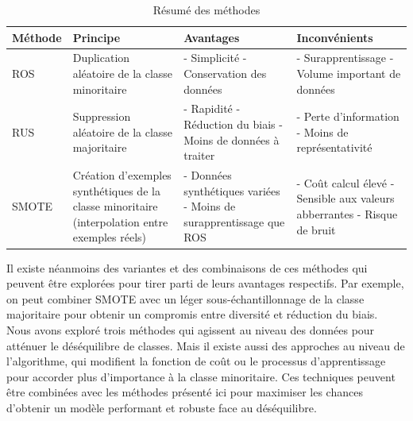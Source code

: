 \documentclass{article}
\begin{document}
\begin{table}[h!]
\centering
\begin{tabular}{|p{1.5cm}|p{4cm}|p{4.5cm}|p{4.2cm}|}
\hline

\centering
\textbf{Méthode} & \textbf{Principe} & \textbf{Avantages} & \textbf{Inconvénients} \\ \hline

\centering
ROS &
Duplication aléatoire de la classe minoritaire &
- Simplicité \newline
- Conservation des données &
- Surapprentissage \newline
- Volume important de \newline données \\ \hline


\centering
RUS &
Suppression aléatoire de la classe majoritaire &
- Rapidité \newline
- Réduction du biais \newline
- Moins de données à traiter &
- Perte d’information \newline
- Moins de représentativité \\ \hline

\centering
SMOTE &
Création d'exemples synthétiques de la classe minoritaire (interpolation entre exemples réels) &
- Données synthétiques \newline variées \newline
- Moins de surapprentissage que ROS &
- Coût calcul élevé \newline
- Sensible aux valeurs \newline abberrantes \newline
- Risque de bruit \\ \hline
\end{tabular}
\caption{Résumé des méthodes}\label{tab:methode}
\end{table}

Il existe néanmoins des variantes et des combinaisons de ces méthodes qui peuvent être explorées pour tirer parti de leurs avantages respectifs. Par exemple, on peut combiner SMOTE avec un léger sous-échantillonnage de la classe majoritaire pour obtenir un compromis entre diversité et réduction du biais.
\\
Nous avons exploré trois méthodes qui agissent au niveau des données pour atténuer le déséquilibre de classes. Mais il existe aussi des approches au niveau de l’algorithme, qui modifient la fonction de coût ou le processus d’apprentissage pour accorder plus d’importance à la classe minoritaire. Ces techniques peuvent être combinées avec les méthodes présenté ici pour maximiser les chances d’obtenir un modèle performant et robuste face au déséquilibre.
\end{document}
